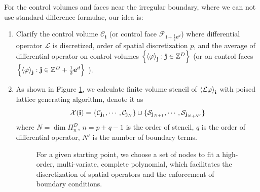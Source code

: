 For the control volumes and faces near the irregular boundary, where
we can not use standard difference formulae, our idea is:
\begin{enumerate}
\item Clarify the control volume $\mathcal{C}_{\mathbf{i}}$ (or
  control face $\mathcal{F}_{\mathbf{i}+\frac{1}{2}\mathbf{e}^d}$)
  where differential operator $\mathcal{L}$ is discretized, order of
  spatial discretization $p$, and the average of differential
  operator on control volumes 
  $\left\{\left<\varphi\right>_{{\mathbf{j}}}:{\mathbf{j}}\in\mathbb{Z}^D\right\}$ (or
  on control faces
  $\left\{\left<\varphi\right>_{{\mathbf{j}}}:{\mathbf{j}}\in\mathbb{Z}^D+\frac{1}{2}{\mathbf{e}}^d\right\}$
  ).
\item As shown in Figure \ref{fig:PLGfigure}, we calculate finite volume stencil of
  $\left<\mathcal{L}\varphi\right>_{{\mathbf{i}}}$ with poised lattice
  generating algorithm, denote it as
  \begin{equation}
    \label{eq:Stencil}
    \mathcal{X}({\mathbf{i}}) =
    \{\mathcal{C}_{{\mathbf{j}}_1},\cdots,\mathcal{C}_{{\mathbf{j}}_N}\} \cup
    \{\mathcal{S}_{{\mathbf{j}}_{N+1}},\cdots,\mathcal{S}_{{\mathbf{j}}_{N+N'}}\}
  \end{equation}
  where $N=\dim\Pi_n^D$, $n=p+q-1$ is the order of stencil, $q$ is the
  order of differential operator, $N'$ is the number of boundary
  terms.

   \begin{figure}[htbp]
  \centering
  \hspace{2cm}
  
  \caption{For a given starting point, we choose a set of nodes to fit
  a high-order, multi-variate, complete polynomial, which facilitates
  the discretization of spatial operators and the enforcement of
  boundary conditions.}
  \label{fig:PLGfigure}
\end{figure}


\end{enumerate}

